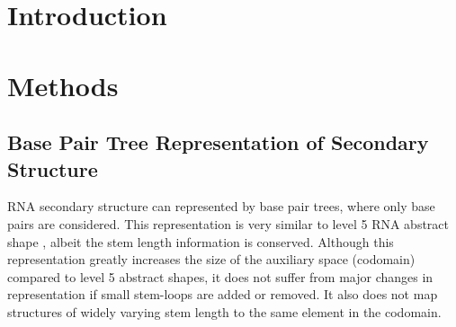 \documentclass[10pt,letterpaper]{article}
\begin{document}
\linenumbers

\section*{Introduction}








\newpage
\section*{Methods}

\subsection*{Base Pair Tree Representation of Secondary Structure}
RNA secondary structure can represented by base pair trees, where only base pairs are considered. This representation is very similar to level 5 RNA abstract shape \cite{abstract_shapes}, albeit the stem length information is conserved.
Although this representation greatly increases the size of the auxiliary space (codomain) compared to level 5 abstract shapes, it does not suffer from major changes in representation if small stem-loops are added or removed. It also does not map structures of widely varying stem length to the same element in the codomain.
\end{document}
